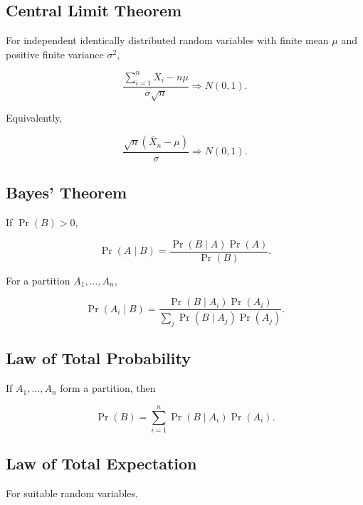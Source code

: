 \subsection{Central Limit Theorem}
\label{subsec:central-limit-theorem-summary}

For independent identically distributed random variables with finite mean
\(\mu\) and positive finite variance \(\sigma^2\),

\[
\boxed{
\frac{
\sum_{i=1}^{n}X_i-n\mu
}{
\sigma\sqrt n
}
\Longrightarrow
N(0,1).
}
\]

Equivalently,

\[
\boxed{
\frac{
\sqrt n(\bar X_n-\mu)
}{
\sigma
}
\Longrightarrow
N(0,1).
}
\]

\subsection{Bayes' Theorem}
\label{subsec:bayes-theorem-summary}

If \(\Pr(B)>0\),

\[
\boxed{
\Pr(A\mid B)
=
\frac{
\Pr(B\mid A)\Pr(A)
}{
\Pr(B)
}.
}
\]

For a partition \(A_1,\ldots,A_n\),

\[
\boxed{
\Pr(A_i\mid B)
=
\frac{
\Pr(B\mid A_i)\Pr(A_i)
}{
\sum_j
\Pr(B\mid A_j)\Pr(A_j)
}.
}
\]

\subsection{Law of Total Probability}
\label{subsec:total-probability-summary}

If \(A_1,\ldots,A_n\) form a partition, then

\[
\boxed{
\Pr(B)
=
\sum_{i=1}^{n}
\Pr(B\mid A_i)
\Pr(A_i).
}
\]

\subsection{Law of Total Expectation}
\label{subsec:total-expectation-summary}

For suitable random variables,

